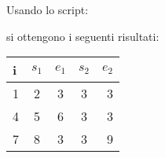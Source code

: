 \par
Usando lo script:

si ottengono i seguenti risultati:

\begin{tabular}{ l | c | c | c | r }
		
  \textbf{i} & \textbf{$s_1$} & \textbf{$e_1$} & \textbf{$s_2$} & \textbf{$e_2$} \\
  \hline	
  1 & 2 & 3 & 3 & 3 \\
  4 & 5 & 6 & 3 & 3 \\
  7 & 8 & 3 & 3 & 9 \\
  \hline  
\end{tabular}